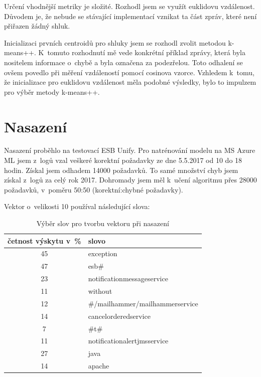 \documentclass[thesis=M,czech]{FITthesis}[2012/10/20]
\begin{document}
			Určení vhodnější metriky je složité. Rozhodl jsem se využít euklidovu vzdálenost. Důvodem je, že nebude se stávající implementací vznikat ta část zpráv, které není přiřazen žádný shluk.
			
			Inicializaci prvních centroidů pro shluky jsem se rozhodl zvolit metodou k-means++. K~tomuto rozhodnutí mě vede konkrétní příklad  zprávy, která byla nositelem informace o~chybě a byla označena za podezřelou. Toto odhalení se ovšem povedlo při měření vzdáleností pomocí cosinova vzorce. Vzhledem k~tomu, že inicializace pro euklidovu vzdálenost měla podobné výsledky, bylo to impulzem pro výběr metody k-means++.
			
		\section{Nasazení}
			Nasazení proběhlo na testovací ESB Unify. Pro natrénování modelu na MS Azure ML jsem z~logů vzal veškeré korektní požadavky ze dne 5.5.2017 od 10 do 18 hodin. Získal jsem odhadem 14000 požadavků. To samé množství chyb jsem získal z~logů za celý rok 2017. Dohromady jsem měl k~učení algoritmu přes 28000 požadavků, v~poměru 50:50 (korektní:chybné požadavky).
			
			Vektor o~velikosti 10 používal následující slova:
			
			\begin{table}[htb]\centering
				\centering
				\caption{Výběr slov pro tvorbu vektoru při nasazení}
				\label{tab:vector-real}
				\begin{tabular}{|c|l|}
					\hline
					\textbf{četnost výskytu v~\%} & \textbf{slovo} \\ \hline
					45                            & exception   \\ \hline
					47                            & esb\#   \\ \hline
					23                            & notificationmessageservice     \\ \hline
					11                            & without     \\ \hline
					12                            & \#/mailhammer/mailhammerservice     \\ \hline
					14                            & cancelorderedservice     \\ \hline
					7                            & \#t\# \\ \hline
					11                            & notificationalertjmsservice  \\ \hline
					27                            & java   \\ \hline
					14                           & apache \\ \hline
				\end{tabular}
			\end{table}
			
\end{document}
